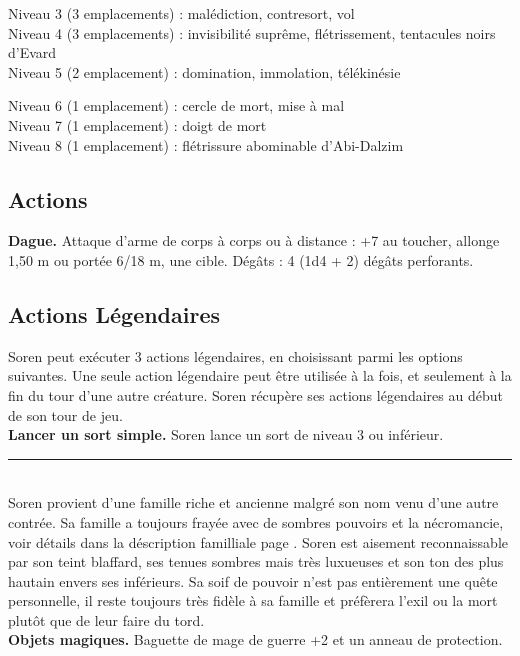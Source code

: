 \begin{figure*}[tb!]
{\begin{minipage}[c]{.45\linewidth}
Niveau 3 (3 emplacements) : malédiction, contresort, vol \\
Niveau 4 (3 emplacements) : invisibilité suprême, flétrissement, tentacules noirs d'Evard\\
Niveau 5 (2 emplacement) : domination, immolation, télékinésie
 \end{minipage}
  \hspace{4pt}
 \begin{minipage}[c]{.45\linewidth}
Niveau 6 (1 emplacement) : cercle de mort, mise à mal \\
Niveau 7 (1 emplacement) : doigt de mort \\
Niveau 8 (1 emplacement) : flétrissure abominable d'Abi-Dalzim
 \vspace{-10pt}
    \subsection*{Actions}
    {\bfseries Dague.} Attaque d'arme de corps à corps ou à distance : +7 au toucher, allonge 1,50 m ou portée 6/18 m,
         une cible. Dégâts : 4 (1d4 + 2) dégâts perforants.
 \vspace{-10pt}
    \subsection*{Actions Légendaires}
    Soren peut exécuter 3 actions légendaires, en choisissant parmi les options suivantes. Une seule action 
    légendaire peut être utilisée à la fois, et seulement à la fin du tour d'une autre créature. Soren 
    récupère ses actions légendaires au début de son tour de jeu. \\
    {\bfseries Lancer un sort simple.} Soren lance un sort de niveau 3 ou inférieur. \\
   \noindent\rule{\textwidth}{1pt} \\
 Soren provient d'une famille riche et ancienne malgré son nom venu d'une autre contrée. Sa famille a 
toujours frayée avec de sombres pouvoirs et la nécromancie, voir détails dans la déscription familliale
page \pageref{vanHjelmaster}. Soren est aisement reconnaissable par son teint blaffard, ses tenues sombres
mais très luxueuses et son ton des plus hautain envers ses inférieurs. Sa soif de pouvoir n'est pas 
entièrement une quête personnelle, il reste toujours très fidèle à sa famille et préfèrera l'exil ou la
mort plutôt que de leur faire du tord. \\
 {\bfseries Objets magiques.} Baguette de mage de guerre +2 et un anneau de protection.
 \end{minipage}
}%
\end{figure*}

